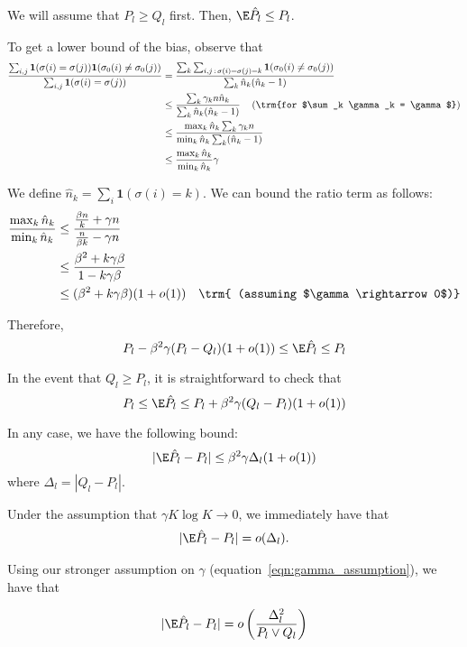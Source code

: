\documentclass{article}
\begin{document}
We will assume that $P_l \geq Q_l$ first. Then, $\E \hat{P}_l \leq P_l$. 

To get a lower bound of the bias, observe that
\begin{align*}
\frac{\sum_{i,j} \mathbf{1}(\sigma(i) = \sigma(j)) \mathbf{1}(\sigma_0(i) \neq \sigma_0(j)) }{\sum_{i,j} \mathbf{1}(\sigma(i) = \sigma(j)) } &= 
   \frac{\sum_k \sum_{i,j \,:\, \sigma(i)=\sigma(j)=k} \mathbf{1}(\sigma_0(i) \neq \sigma_0(j))}{\sum_k \hat{n}_k (\hat{n}_k-1)} \\
  &\leq \frac{ \sum_k \gamma_k n \hat{n}_k }{\sum_k \hat{n}_k(\hat{n}_k - 1)} \quad
  \left(\trm{for $\sum_k \gamma_k = \gamma$}  \right) \\
  &\leq \frac{\max_k \hat{n}_k \sum_k \gamma_k n }{\min_k \hat{n}_k \sum_k (\hat{n}_k - 1)} \\
 &\leq \frac{\max_k \hat{n}_k }{\min_k \hat{n}_k} \gamma
\end{align*}

We define $\hat{n}_k = \sum_i \mathbf{1}(\sigma(i) = k)$. We can bound the ratio term as follows:
\begin{align*}
\frac{\max_k \hat{n}_k}{\min_k \hat{n}_k} &\leq
   \frac{ \frac{\beta n}{k} + \gamma n}{\frac{n}{\beta k} - \gamma n} \\
  &\leq \frac{\beta^2 + k \gamma \beta}{1 - k \gamma \beta} \\
 &\leq (\beta^2 + k\gamma \beta) (1 + o(1)) \quad \trm{
         (assuming $\gamma \rightarrow 0$)}
\end{align*}


Therefore, 
\[
P_l - \beta^2 \gamma (P_l - Q_l) (1 + o(1))  \leq \E \hat{P}_l \leq P_l
\]

In the event that $Q_l \geq P_l$, it is straightforward to check that
\[
P_l \leq \E \hat{P}_l \leq P_l + \beta^2 \gamma (Q_l - P_l)(1+o(1))
\]

In any case, we have the following bound:
\[
| \E \hat{P}_l - P_l |\leq \beta^2 \gamma \Delta_l (1 + o(1)) 
\]
where $\Delta_l  = |Q_l - P_l|$. 

Under the assumption that $\gamma K \log K \rightarrow 0$, we immediately have that 
\begin{align}
| \E \hat{P}_l - P_l | = o( \Delta_l ).
\end{align} 

Using our stronger assumption on $\gamma$ (equation~\ref{eqn:gamma_assumption}), we have that

\begin{align}
| \E \hat{P}_l - P_l | = o\left( \frac{\Delta_l^2}{P_l \vee Q_l} \right) 
\label{eqn:Pl_bias}
\end{align}
\end{document}
